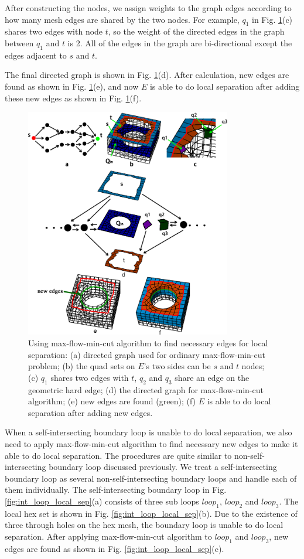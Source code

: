 \documentclass[final,5p,times,twocolumn]{elsarticle}
\begin{document}
After constructing the nodes, we assign weights to the graph edges according to how many mesh edges are shared by the two nodes. For example, $q_1$ in Fig. \ref{fig:max_flow_graph}(c) shares two edges with node $t$, so the weight of the directed edges in the graph between $q_1$ and $t$ is 2. All of the edges in the graph are bi-directional except the edges adjacent to $s$ and $t$.

The final directed graph is shown in Fig. \ref{fig:max_flow_graph}(d). After calculation, new edges are found as shown in Fig. \ref{fig:max_flow_graph}(e), and now $E$ is able to do local separation after adding these new edges as shown in  Fig. \ref{fig:max_flow_graph}(f).

\begin{figure}[htbp]
\begin{center}
\includegraphics[width=9cm]{figures/max_flow_graph.png}
\caption{Using max-flow-min-cut algorithm to find necessary edges for local separation: (a) directed graph used for ordinary max-flow-min-cut problem; (b) the quad sets on $E$'s two sides can be $s$ and $t$ nodes; (c) $q_1$ shares two edges with $t$, $q_2$ and $q_3$ share an edge on the geometric hard edge; (d) the directed graph for max-flow-min-cut algorithm; (e) new edges are found (green); (f) $E$ is able to do local separation after adding new edges.}
\label{fig:max_flow_graph}
\end{center}
\end{figure}

When a self-intersecting boundary loop is unable to do local separation, we also need to apply max-flow-min-cut algorithm to find necessary new edges to make it able to do local separation. The procedures are quite similar to non-self-intersecting boundary loop discussed previously. We treat a self-intersecting boundary loop as several non-self-intersecting boundary loops and handle each of them individually. The self-intersecting boundary loop in Fig. \ref{fig:int_loop_local_sep}(a) consists of three sub loops $loop_1$, $loop_2$ and $loop_3$. The local hex set is shown in Fig. \ref{fig:int_loop_local_sep}(b). Due to the existence of three through holes on the hex mesh, the boundary loop is unable to do local separation. After applying max-flow-min-cut algorithm to $loop_1$ and $loop_3$, new edges are found as shown in Fig. \ref{fig:int_loop_local_sep}(c).
\end{document}
